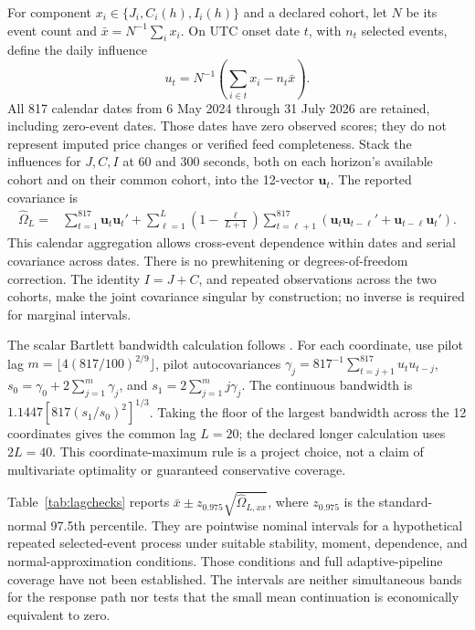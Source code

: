 \documentclass[12pt,letterpaper]{article}
\begin{document}
For component $x_i\in\{J_i,C_i(h),I_i(h)\}$ and a declared cohort, let $N$ be its event count and $\bar x=N^{-1}\sum_i x_i$. On UTC onset date $t$, with $n_t$ selected events, define the daily influence
\[
 u_t=N^{-1}\left(\sum_{i\in t}x_i-n_t\bar x\right).
\]
All 817 calendar dates from 6 May 2024 through 31 July 2026 are retained, including zero-event dates. Those dates have zero observed scores; they do not represent imputed price changes or verified feed completeness. Stack the influences for $J,C,I$ at 60 and 300 seconds, both on each horizon's available cohort and on their common cohort, into the 12-vector $\mathbf u_t$. The reported covariance is
\begin{align}
 \widehat\Omega_L={}&\sum_{t=1}^{817}\mathbf u_t\mathbf u_t'
 +\sum_{\ell=1}^{L}\left(1-\frac{\ell}{L+1}\right)
 \sum_{t=\ell+1}^{817}
 (\mathbf u_t\mathbf u_{t-\ell}'+\mathbf u_{t-\ell}\mathbf u_t').
\end{align}
This calendar aggregation allows cross-event dependence within dates and serial covariance across dates. There is no prewhitening or degrees-of-freedom correction. The identity $I=J+C$, and repeated observations across the two cohorts, make the joint covariance singular by construction; no inverse is required for marginal intervals.

The scalar Bartlett bandwidth calculation follows \citet{newey1994automatic}. For each coordinate, use pilot lag $m=\lfloor4(817/100)^{2/9}\rfloor$, pilot autocovariances $\gamma_j=817^{-1}\sum_{t=j+1}^{817}u_tu_{t-j}$, $s_0=\gamma_0+2\sum_{j=1}^{m}\gamma_j$, and $s_1=2\sum_{j=1}^{m}j\gamma_j$. The continuous bandwidth is $1.1447[817(s_1/s_0)^2]^{1/3}$. Taking the floor of the largest bandwidth across the 12 coordinates gives the common lag $L=20$; the declared longer calculation uses $2L=40$. This coordinate-maximum rule is a project choice, not a claim of multivariate optimality or guaranteed conservative coverage.

Table~\ref{tab:lagchecks} reports $\bar x\pm z_{0.975}\sqrt{\widehat\Omega_{L,xx}}$, where $z_{0.975}$ is the standard-normal 97.5th percentile. They are pointwise nominal intervals for a hypothetical repeated selected-event process under suitable stability, moment, dependence, and normal-approximation conditions. Those conditions and full adaptive-pipeline coverage have not been established. The intervals are neither simultaneous bands for the response path nor tests that the small mean continuation is economically equivalent to zero.
\end{document}
